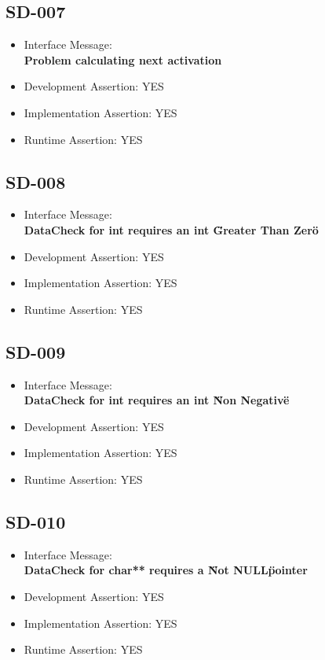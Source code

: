 \subsection{SD-007}
\begin{itemize}
  \item Interface Message:\\[1em]
    \textbf{Problem calculating next activation}
  \item Development Assertion: YES
  \item Implementation Assertion: YES
  \item Runtime Assertion: YES
\end{itemize}

\subsection{SD-008}
\begin{itemize}
  \item Interface Message:\\[1em]
    \textbf{DataCheck for int requires an int \"Greater Than Zero\"}
  \item Development Assertion: YES
  \item Implementation Assertion: YES
  \item Runtime Assertion: YES
\end{itemize}

\subsection{SD-009}
\begin{itemize}
  \item Interface Message:\\[1em]
    \textbf{DataCheck for int requires an int \"Non Negative\"}
  \item Development Assertion: YES
  \item Implementation Assertion: YES
  \item Runtime Assertion: YES
\end{itemize}

\subsection{SD-010}
\begin{itemize}
  \item Interface Message:\\[1em]
    \textbf{DataCheck for char** requires a \"Not NULL\" pointer}
  \item Development Assertion: YES
  \item Implementation Assertion: YES
  \item Runtime Assertion: YES
\end{itemize}

